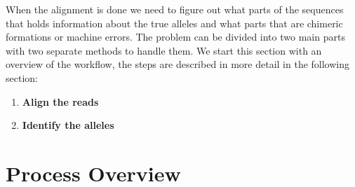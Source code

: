 \documentclass[a4paper,11pt]{kth-mag}
\begin{document}
When the alignment is done we need to figure out what parts of the sequences that holds information about the true alleles and what parts that are chimeric formations or machine errors. The problem can be divided into two main parts with two separate methods to handle them. We start this section with an overview of the workflow, the steps are described in more detail in the following section:

\begin{enumerate}
	\item \textbf{Align the reads}
	\item \textbf{Identify the alleles}
\end{enumerate}

\section{Process Overview}
\end{document}
